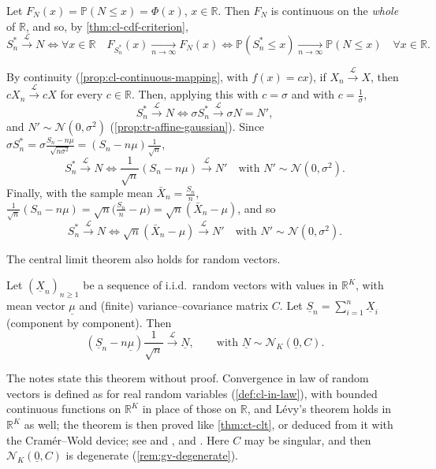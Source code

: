 \begin{remark}\label{rem:ct-cdf}
Let $F_N(x)=\mathbb P(N\le x)=\Phi(x)$, $x\in\mathbb R$. Then $F_N$ is continuous on the
\emph{whole} of $\mathbb R$, and so, by \cref{thm:cl-cdf-criterion},
\[
  S_n^*\xrightarrow{\mathcal L}N\iff\forall x\in\mathbb R\quad F_{S_n^*}(x)\xrightarrow[n\to\infty]{}F_N(x)
  \iff\mathbb P(S_n^*\le x)\xrightarrow[n\to\infty]{}\mathbb P(N\le x)\quad\forall x\in\mathbb R .
\]
\end{remark}

\begin{remark}\label{rem:ct-equivalent-forms}
By continuity (\cref{prop:cl-continuous-mapping}, with $f(x)=cx$), if
$X_n\xrightarrow{\mathcal L}X$, then $cX_n\xrightarrow{\mathcal L}cX$ for every $c\in\mathbb R$.
Then, applying this with $c=\sigma$ and with $c=\frac1\sigma$,
\[
  S_n^*\xrightarrow{\mathcal L}N\iff\sigma S_n^*\xrightarrow{\mathcal L}\sigma N=N' ,
\]
and $N'\sim\mathcal N(0,\sigma^2)$ (\cref{prop:tr-affine-gaussian}). Since
$\sigma S_n^*=\sigma\frac{S_n-n\mu}{\sqrt{n\sigma^2}}=(S_n-n\mu)\frac1{\sqrt n}$,
\[
  S_n^*\xrightarrow{\mathcal L}N\iff\frac1{\sqrt n}(S_n-n\mu)\xrightarrow{\mathcal L}N'\quad\text{with }
  N'\sim\mathcal N(0,\sigma^2).
\]
Finally, with the sample mean $\bar X_n=\frac{S_n}n$,
$\frac1{\sqrt n}(S_n-n\mu)=\sqrt n\big(\frac{S_n}n-\mu\big)=\sqrt n(\bar X_n-\mu)$, and so
\begin{equation}\label{eq:ct-clt-mean}
  S_n^*\xrightarrow{\mathcal L}N\iff\sqrt n(\bar X_n-\mu)\xrightarrow{\mathcal L}N'\quad\text{with }
  N'\sim\mathcal N(0,\sigma^2).
\end{equation}
\end{remark}

The central limit theorem also holds for random vectors.

\begin{theorem}\label{thm:ct-clt-vector}
Let $(\underline X_n)_{n\ge1}$ be a sequence of i.i.d.\ random vectors with values in
$\mathbb R^K$, with mean vector $\underline\mu$ and (finite) variance--covariance matrix $C$. Let
$\underline S_n=\sum_{i=1}^n\underline X_i$ (component by component). Then
\[
  (\underline S_n-n\underline\mu)\frac1{\sqrt n}\xrightarrow{\mathcal L}\underline N,\qquad
  \text{with }\underline N\sim\mathcal N_K(\underline0,C).
\]
\end{theorem}

The notes state this theorem without proof. Convergence in law of random vectors is defined as
for real random variables (\cref{def:cl-in-law}), with bounded continuous functions on
$\mathbb R^K$ in place of those on $\mathbb R$, and Lévy's theorem holds in $\mathbb R^K$ as well;
the theorem is then proved like \cref{thm:ct-clt}, or deduced from it with the Cramér--Wold
device; see \citet[Section~29]{billingsley} and \citet[Section~3.10]{durrett}, and
. Here $C$ may be singular, and then $\mathcal N_K(\underline0,C)$ is
degenerate (\cref{rem:gv-degenerate}).

